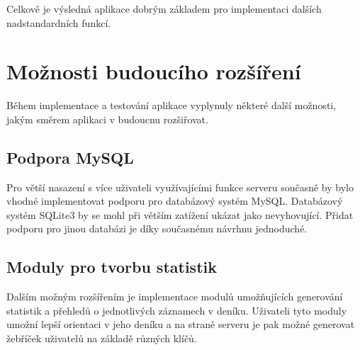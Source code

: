 Celkově je výsledná aplikace dobrým základem pro implementaci dalších nadstandardních funkcí.


\section{Možnosti budoucího rozšíření}

Během implementace a testování aplikace vyplynuly některé další možnosti, jakým směrem aplikaci v budoucnu rozšiřovat.

\subsection{Podpora MySQL}

Pro větší nasazení s více uživateli využívajícími funkce serveru současně by bylo vhodné implementovat podporu pro databázový
systém MySQL. Databázový systém SQLite3 by se mohl při větším zatížení ukázat jako nevyhovující. Přidat podporu pro jinou databázi
je díky současnému návrhnu jednoduché. %

\subsection{Moduly pro tvorbu statistik}

Dalším možným rozšířením je implementace modulů umožňujících generování statistik a přehledů o jednotlivých záznamech v deníku.
Uživateli tyto moduly umožní lepší orientaci v jeho deníku a na straně serveru je pak možné generovat žebříček uživatelů na
základě různých klíčů.


